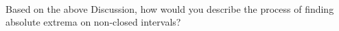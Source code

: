 \documentclass[10pt]{article}
\begin{document}
~\\
 Based on the above Discussion, how would you describe the process of finding absolute extrema on non-closed intervals? 
\vfill



%
%
%
%
%
%
\end{document}
